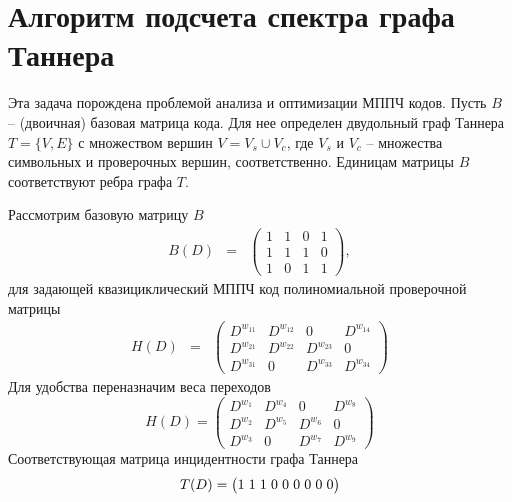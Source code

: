 \chapter{Алгоритм подсчета спектра графа Таннера}

Эта задача порождена проблемой анализа и оптимизации МППЧ кодов. 
Пусть $B$  -- (двоичная) базовая матрица кода.
Для нее определен двудольный граф Таннера $T=\{V, E \}$ с множеством вершин 
$V= V_s \cup V_c$, где  $V_s$ и  $V_c$ -- множества символьных и проверочных вершин, 
соответственно. Единицам  матрицы $B$ соответствуют ребра графа $T$. 


\begin{example} \label{ex1}
Рассмотрим  базовую матрицу $B$ 
\begin{eqnarray}%
B(D)&=&
\begin{pmatrix}
1&1&0&   1\\
1&1&1& 0\\
1&0         & 1& 1
\end{pmatrix},       
\end{eqnarray}
для задающей квазициклический МППЧ код полиномиальной проверочной матрицы 
\begin{eqnarray}%
H(D)&=&
\begin{pmatrix}
D^{w_{11}}&D^{w_{12}}&0&   D^{w_{14}}\\
D^{w_{21}}&D^{w_{22}}& D^{w_{23}}& 0\\
D^{w_{31}}&0         &  D^{w_{33}}& D^{w_{34}}
\end{pmatrix}                          \label{H0}                                                                                                                  
\end{eqnarray}
Для удобства переназначим веса переходов
\begin{equation} \label{H}
H(D)=
\begin{pmatrix}
D^{w_{1}}&D^{w_{4}}&0                   &   D^{w_{8}}\\
D^{w_{2}}&D^{w_{5}}& D^{w_{6}}& 0\\
D^{w_{3}}&0                &  D^{w_{7}}& D^{w_{9}}
\end{pmatrix}                                                                                                                                           
\end{equation}
Соответствующая матрица инцидентности графа Таннера 
\[
\arraycolsep=1.5pt \def\arraystretch{1}
T(D)=
\begin{pmatrix}
1   &        1 &  1& 0 &0 & 0 &   0 &  0 &  0 \\

\end{pmatrix}\]
\end{example}
